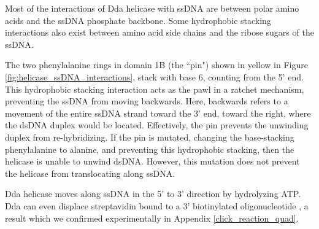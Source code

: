 Most of the interactions of Dda helicase with ssDNA are between polar amino acids and the ssDNA phosphate backbone.  Some hydrophobic stacking interactions also exist between amino acid side chains and the ribose sugars of the ssDNA. \citep{He2012}

The two phenylalanine rings in domain 1B (the ``pin") shown in yellow in Figure \ref{fig:helicase_ssDNA_interactions}, stack with base 6, counting from the 5' end.  This hydrophobic stacking interaction acts as the pawl in a ratchet mechanism, preventing the ssDNA from moving backwards.  Here, backwards refers to a movement of the entire ssDNA strand toward the 3' end, toward the right, where the dsDNA duplex would be located.  Effectively, the pin prevents the unwinding duplex from re-hybridizing.  If the pin is mutated, changing the base-stacking phenylalanine to alanine, and preventing this hydrophobic stacking, then the helicase is unable to unwind dsDNA.  However, this mutation does not prevent the helicase from translocating along ssDNA. \citep{He2012}

Dda helicase moves along ssDNA in the 5' to 3' direction by hydrolyzing ATP.  Dda can even displace streptavidin bound to a 3' biotinylated oligonucleotide \citep{Morris1999}, a result which we confirmed experimentally in Appendix \ref{click_reaction_quad}.
